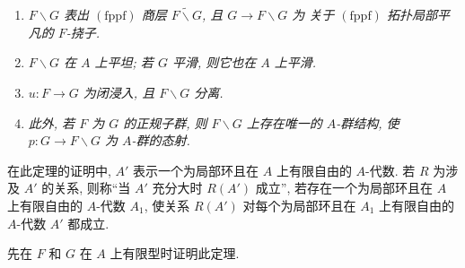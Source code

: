 \begin{enumerate}
\begin{enumerate}
\item[(a\(^{\prime}\))] \textit{\(F\backslash G\) 表出 \((\mathrm{fppf})\) 商层
\(\widetilde{F\backslash G}\), 且 \(G\to F\backslash G\) 为
关于 \((\mathrm{fppf})\) 拓扑局部平凡的 \(F\)-挠子.}

\item[(b)] \textit{\(F\backslash G\) 在 \(A\) 上平坦;
若 \(G\) 平滑, 则它也在 \(A\) 上平滑.}

\item[(c)] \textit{\(u:F\to G\) 为闭浸入, 且 \(F\backslash G\) 分离.}

\item[(d)] \textit{此外, 若 \(F\) 为 \(G\) 的正规子群,
则 \(F\backslash G\) 上存在唯一的 \(A\)-群结构,
使 \(p:G\to F\backslash G\) 为 \(A\)-群的态射.}
\end{enumerate}
\end{enumerate}

在此定理的证明中, \(A'\) 表示一个为局部环且在 \(A\) 上有限自由的
\(A\)-代数. 若 \(R\) 为涉及 \(A'\) 的关系,
则称``当 \(A'\) 充分大时 \(R(A')\) 成立'', 若存在一个为局部环且在
\(A\) 上有限自由的 \(A\)-代数 \(A_1\),
使关系 \(R(A')\) 对每个为局部环且在 \(A_1\) 上有限自由的
\(A\)-代数 \(A'\) 都成立.

先在 \(F\) 和 \(G\) 在 \(A\) 上有限型时证明此定理.
